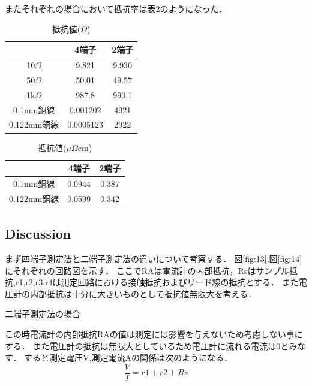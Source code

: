 \documentclass[11pt, a4paper,twocolumn]{jarticle}
\begin{document}
またそれぞれの場合において抵抗率は表\ref{tab:2}のようになった．

\begin{table}[htb]
  \begin{center}
      \caption{抵抗値($\Omega$)}
        \begin{tabular}{|c|c|c|} \hline
              & 4端子 & 2端子 \\ \hline
          10$\Omega$ & 9.821 & 9.930  \\
          50$\Omega$ & 50.01 & 49.57 \\
          1k$\Omega$ & 987.8 & 990.1 \\
          0.1mm銅線   & 0.001202 & 4921 \\
          0.122mm銅線 & 0.0005123 & 2922 \\ \hline
        \end{tabular}
        \label{tab:1}
  \end{center}
\end{table}

\begin{table}[htb]
  \begin{center}
      \caption{抵抗値($\mu\Omega$cm)}
        \begin{tabular}{|c|c|c|} \hline
              & 4端子 & 2端子 \\ \hline
          0.1mm銅線   & 0.0944 & 0.387 \\
          0.122mm銅線 & 0.0599 & 0.342 \\ \hline
        \end{tabular}
        \label{tab:2}
  \end{center}
\end{table}



\subsection{Discussion}
まず四端子測定法と二端子測定法の違いについて考察する．
図\ref{fig:13},図\ref{fig:14}にそれぞれの回路図を示す．
ここでRAは電流計の内部抵抗，Rsはサンプル抵抗,r1,r2,r3,r4は測定回路における接触抵抗およびリード線の抵抗とする．
また電圧計の内部抵抗は十分に大きいものとして抵抗値無限大を考える．

\noindent
二端子測定法の場合

この時電流計の内部抵抗RAの値は測定には影響を与えないため考慮しない事にする．
また電圧計の抵抗は無限大としているため電圧計に流れる電流は0とみなす．
すると測定電圧V,測定電流Aの関係は次のようになる．
\begin{equation}
    \frac{V}{I} = r1 + r2 + Rs
\end{equation}
\end{document}
